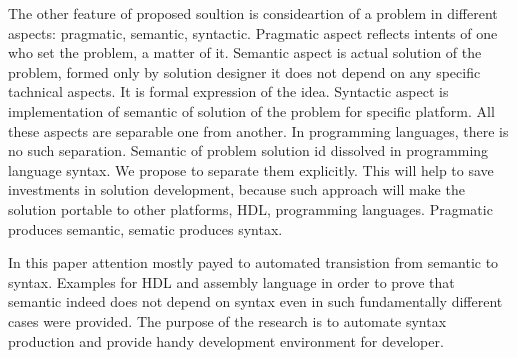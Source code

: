 The other feature of proposed soultion is consideartion of a problem in different aspects: pragmatic, semantic, syntactic. Pragmatic aspect reflects intents of one who set the problem, a matter of it. Semantic aspect is actual solution of the problem, formed only by solution designer it does not depend on any specific tachnical aspects. It is formal expression of the idea. Syntactic aspect is implementation of semantic of solution of the problem for specific platform. All these aspects are separable one from another. In programming languages, there is no such separation. Semantic of problem solution id dissolved in programming language syntax. We propose to separate them explicitly. This will help to save investments in solution development, because such approach will make the solution portable to other platforms, HDL, programming languages. Pragmatic produces semantic, sematic produces syntax.

In this paper attention mostly payed to automated transistion from semantic to syntax. Examples for HDL and assembly language in order to prove that semantic indeed does not depend on syntax even in such fundamentally different cases were provided. The purpose of the research is to automate syntax production and provide handy development environment for developer.
